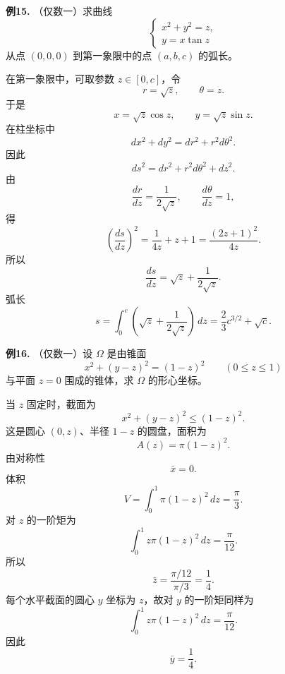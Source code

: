 \begin{problemblock}
\textbf{例15.} （仅数一）求曲线
\[
\begin{cases}
x^2+y^2=z,\\
y=x\tan z
\end{cases}
\]
从点 \((0,0,0)\) 到第一象限中的点 \((a,b,c)\) 的弧长。
\end{problemblock}
\begin{solutionblock}
在第一象限中，可取参数 \(z\in[0,c]\)，令
\[
r=\sqrt z,\qquad \theta=z.
\]
于是
\[
x=\sqrt z\cos z,\qquad y=\sqrt z\sin z.
\]
在柱坐标中
\[
dx^2+dy^2=dr^2+r^2d\theta^2.
\]
因此
\[
ds^2=dr^2+r^2d\theta^2+dz^2.
\]
由
\[
\frac{dr}{dz}=\frac1{2\sqrt z},\qquad \frac{d\theta}{dz}=1,
\]
得
\[
\left(\frac{ds}{dz}\right)^2
=\frac1{4z}+z+1
=\frac{(2z+1)^2}{4z}.
\]
所以
\[
\frac{ds}{dz}=\sqrt z+\frac1{2\sqrt z}.
\]
弧长
\[
s=\int_0^c\left(\sqrt z+\frac1{2\sqrt z}\right)\,dz
=\frac23c^{3/2}+\sqrt c.
\]
\end{solutionblock}

\begin{problemblock}
\textbf{例16.} （仅数一）设 \(\Omega\) 是由锥面
\[
x^2+(y-z)^2=(1-z)^2\qquad (0\le z\le1)
\]
与平面 \(z=0\) 围成的锥体，求 \(\Omega\) 的形心坐标。
\end{problemblock}
\begin{solutionblock}
当 \(z\) 固定时，截面为
\[
x^2+(y-z)^2\le(1-z)^2.
\]
这是圆心 \((0,z)\)、半径 \(1-z\) 的圆盘，面积为
\[
A(z)=\pi(1-z)^2.
\]
由对称性
\[
\bar x=0.
\]
体积
\[
V=\int_0^1\pi(1-z)^2\,dz=\frac{\pi}{3}.
\]
对 \(z\) 的一阶矩为
\[
\int_0^1 z\pi(1-z)^2\,dz=\frac{\pi}{12}.
\]
所以
\[
\bar z=\frac{\pi/12}{\pi/3}=\frac14.
\]
每个水平截面的圆心 \(y\) 坐标为 \(z\)，故对 \(y\) 的一阶矩同样为
\[
\int_0^1 z\pi(1-z)^2\,dz=\frac{\pi}{12}.
\]
因此
\[
\bar y=\frac14.
\]
\end{solutionblock}

